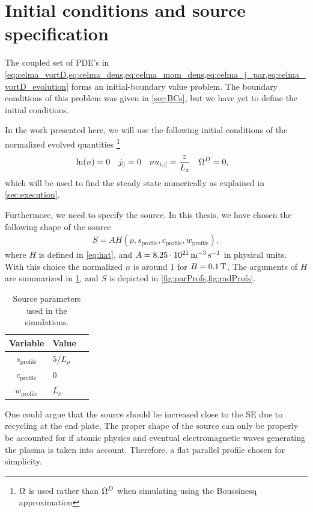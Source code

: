 \section{Initial conditions and source specification}
\label{sec:initRun}
%
The coupled set of PDE's in \cref{eq:celma_vortD,eq:celma_dens,eq:celma_mom_dens,eq:celma_j_par,eq:celma_vortD_evolution} forms an initial-boundary value problem.
The boundary conditions of this problem was given in \cref{sec:BCs}, but we have yet to define the initial conditions.

In the work presented here, we will use the following initial conditions of the normalized evolved quantities%
%
\footnote{$\Omega$ is used rather than $\Omega^D$ when simulating using the Boussinesq approximation}%
%
\begin{align*}
    &\ln(n)    = 0&
    &j_\|      = 0&
    &nu_{i,\|} = \frac{z}{L_z}&
    &\Omega^D     = 0,&
\end{align*}
%
which will be used to find the steady state numerically as explained in \cref{sec:execution}.

Furthermore, we need to specify the source.
In this thesis, we have chosen the following shape of the source
%
\begin{align*}
    S = AH(\rho,s_{\text{profile}},c_{\text{profile}},w_{\text{profile}}),
\end{align*}
%
where $H$ is defined in \cref{eq:hat}, and $A=8.25\cdot10^{21} \, \text{m}^{-3}\, \text{s}^{-1}$ in physical units.
With this choice the normalized $n$ is around $1$ for $B=0.1\, \text{T}$.
The arguments of $H$ are summarized in \cref{tb:source}, and $S$ is depicted in \cref{fig:parProfs,fig:radProfs}.
%
\begin{table}[!htb]
      \centering
        \caption{Source parameters used in the simulations.}
            \begin{tabular}{c|ll}
            \hline\hline
            Variable & Value \\
            \hline
            $s_{\text{profile}}$ & $5/L_\rho$\\
            $c_{\text{profile}}$ & $0$       \\
            $w_{\text{profile}}$ & $L_\rho$  \\
            \hline\hline
            \end{tabular}
            \label{tb:source}
\end{table}

One could argue that the source should be increased close to the SE due to recycling at the end plate,
The proper shape of the source can only be properly be accounted for if atomic physics and eventual electromagnetic waves generating the plasma is taken into account.
Therefore, a flat parallel profile chosen for simplicity.

